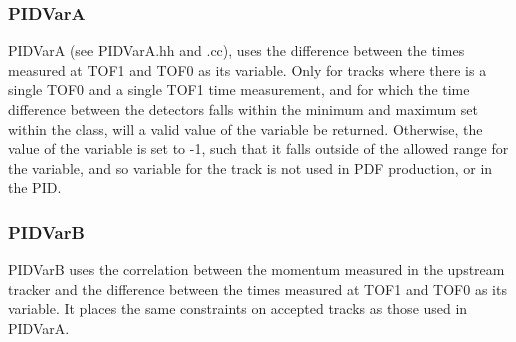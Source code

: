 \documentclass[a4paper,12pt]{article}
\begin{document}
\subsubsection{PIDVarA}
\label{PIDVarA}
PIDVarA (see PIDVarA.hh and .cc), uses the difference between the times measured at TOF1 
and TOF0 as its variable. Only for tracks where there is a single TOF0 
and a single TOF1 time measurement, and for which the time difference 
between the detectors falls within the minimum and maximum set within 
the class, will a valid value of the variable be returned. Otherwise, 
the value of the variable is set to -1, such that it falls outside of 
the allowed range for the variable, and so variable for the track is 
not used in PDF production, or in the PID.

\subsubsection{PIDVarB}
\label{PIDVarB}
PIDVarB uses the correlation between the momentum measured in the upstream tracker 
and the difference between the times measured at TOF1 and TOF0 as its variable.
It places the same constraints on accepted tracks as those used in PIDVarA.


\clearpage


\end{document}
